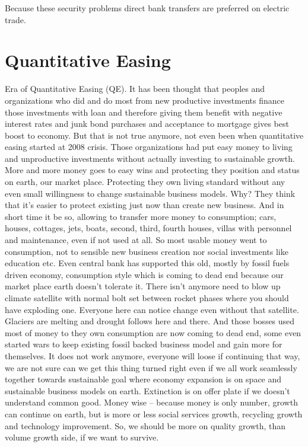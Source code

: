 Because these security problems direct bank transfers are preferred on
electric trade.

\section{Quantitative Easing}
Era of Quantitative Easing (QE). It has been thought that peoples and
organizations who did and do most from new productive investments finance
those investments with loan and therefore giving them benefit with negative
interest rates and junk bond purchases and acceptance to mortgage gives best
boost to economy. But that is not true anymore, not even been when
quantitative easing started at 2008 crisis. Those organizations had put easy
money to living and unproductive investments without actually investing to
sustainable growth. More and more money goes to easy wins and protecting they
position and status on earth, our market place. Protecting they own living
standard without any even small willingness to change sustainable business
models. Why? They think that it's easier to protect existing just now than
create new business. And in short time it be so, allowing to transfer more
money to consumption; cars, houses, cottages, jets, boats, second, third,
fourth houses, villas with personnel and maintenance, even if not used at all.
So most usable money went to consumption, not to sensible new business
creation nor social investments like education etc. Even central bank has
supported this old, mostly by fossil fuels driven economy, consumption style
which is coming to dead end because our market place earth doesn't tolerate
it. There isn't anymore need to blow up climate satellite with normal bolt set
between rocket phases where you should have exploding one. Everyone here can
notice change even without that satellite. Glaciers are melting and drought
follows here and there. And those bosses used most of money to they own
consumption are now coming to dead end, some even started wars to keep
existing fossil backed business model and gain more for themselves. It does
not work anymore, everyone will loose if continuing that way, we are not sure
can we get this thing turned right even if we all work seamlessly together
towards sustainable goal where economy expansion is on space and sustainable
business models on earth. Extinction is on offer plate if we doesn't
understand common good. Money wise -- because money is only number, growth
can continue on earth, but is more or less social services growth, recycling
growth and technology improvement. So, we should be more on quality growth,
than volume growth side, if we want to survive.

